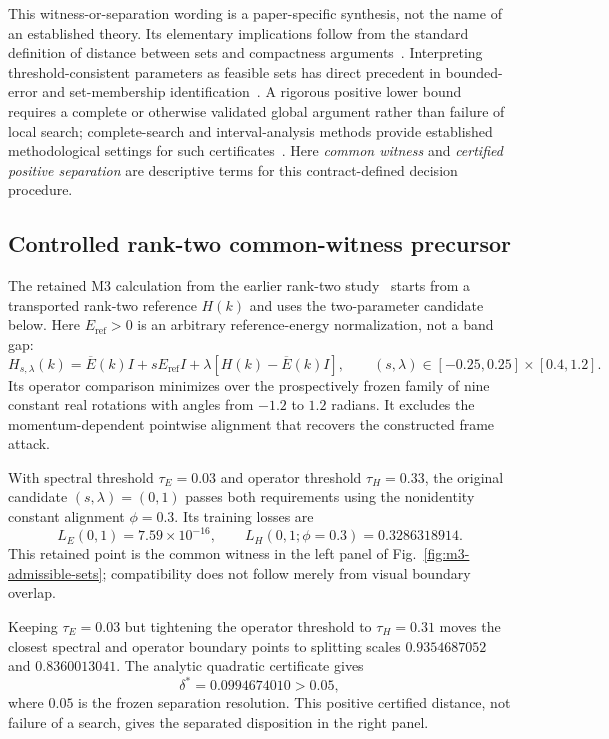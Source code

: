 \documentclass[11pt]{article}
\begin{document}
This witness-or-separation wording is a paper-specific synthesis, not the name of an
established theory. Its elementary implications follow from the standard definition of
distance between sets and compactness arguments~\cite{rudin1976}. Interpreting
threshold-consistent parameters as feasible sets has direct precedent in bounded-error
and set-membership identification~\cite{milaneseEtAl1996}. A rigorous positive lower
bound requires a complete or otherwise validated global argument rather than failure of
local search; complete-search and interval-analysis methods provide established
methodological settings for such certificates~\cite{neumaier2004,mooreKearfottCloud2009}.
Here \emph{common witness} and \emph{certified positive separation} are descriptive terms
for this contract-defined decision procedure.

\subsection{Controlled rank-two common-witness precursor}
The retained M3 calculation from the earlier rank-two study~\cite{Ragasa2026a} starts
from a transported rank-two reference $H(k)$ and uses the two-parameter candidate below.
Here $E_{\mathrm{ref}}>0$ is an
arbitrary reference-energy normalization, not a band gap:
\begin{equation}
 H_{s,\lambda}(k)=\overline E(k)I+sE_{\mathrm{ref}}I
 +\lambda\left[H(k)-\overline E(k)I\right],
 \qquad (s,\lambda)\in[-0.25,0.25]\times[0.4,1.2].
\end{equation}
Its operator comparison minimizes over the prospectively frozen family of nine constant
real rotations with angles from $-1.2$ to $1.2$ radians. It excludes the
momentum-dependent pointwise alignment that recovers the constructed frame attack.

With spectral threshold $\tau_E=0.03$ and operator threshold $\tau_H=0.33$, the original
candidate $(s,\lambda)=(0,1)$ passes both requirements using the nonidentity constant
alignment $\phi=0.3$. Its training losses are
\begin{equation}
 L_E(0,1)=7.59\times10^{-16},
 \qquad
 L_H(0,1;\phi=0.3)=0.3286318914.
\end{equation}
This retained point is the common witness in the left panel of
Fig.~\ref{fig:m3-admissible-sets}; compatibility does not follow merely from visual
boundary overlap.

Keeping $\tau_E=0.03$ but tightening the operator threshold to $\tau_H=0.31$ moves the
closest spectral and operator boundary points to splitting scales
$0.9354687052$ and $0.8360013041$. The analytic quadratic certificate gives
\begin{equation}
 \delta^*=0.0994674010>0.05,
\end{equation}
where $0.05$ is the frozen separation resolution. This positive certified distance,
not failure of a search, gives the separated disposition in the right panel.
\end{document}

